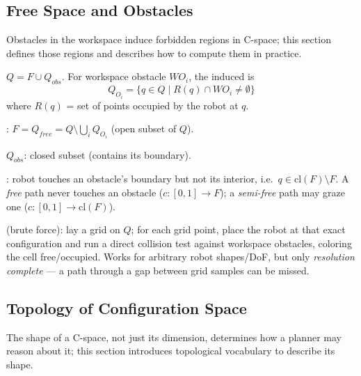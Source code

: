 \subsection{Free Space and Obstacles}

Obstacles in the workspace induce forbidden regions in C-space; this section defines those regions and describes how to compute them in practice.

$Q=F\cup Q_{obs}$. For workspace obstacle $WO_i$, the induced  is
\[
Q_{O_i}=\{q\in Q \mid R(q)\cap WO_i\neq\emptyset\}
\]
where $R(q)$ = set of points occupied by the robot at $q$.

: $F=Q_{free}=Q\setminus\bigcup_i Q_{O_i}$ (open subset of $Q$).

 $Q_{obs}$: closed subset (contains its boundary).

: robot touches an obstacle's boundary but not its interior, i.e.\ $q\in \mathrm{cl}(F)\setminus F$. A \emph{free} path never touches an obstacle ($c:[0,1]\to F$); a \emph{semi-free} path may graze one ($c:[0,1]\to \mathrm{cl}(F)$).
\\
\begin{notebox}
 (brute force): lay a grid on $Q$; for each grid point, place the robot at that exact configuration and run a direct collision test against workspace obstacles, coloring the cell free/occupied. Works for arbitrary robot shapes/DoF, but only \emph{resolution complete} --- a path through a gap between grid samples can be missed.
\end{notebox}

\subsection{Topology of Configuration Space}

The shape of a C-space, not just its dimension, determines how a planner may reason about it; this section introduces topological vocabulary to describe its shape.

